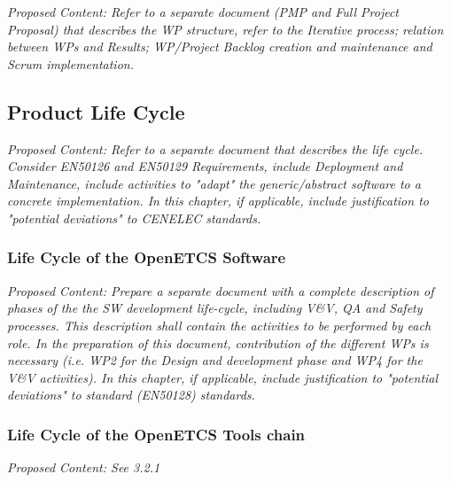 \documentclass{template/openetcs_article}
\begin{document}
\textit{Proposed Content: Refer to a separate document (PMP and Full Project Proposal)  that describes the WP structure, refer to  the Iterative process; relation between WPs and Results; WP/Project Backlog creation and maintenance and Scrum implementation.}


\subsection{Product Life Cycle }

\textit{Proposed Content: Refer to a separate document that describes the life cycle. Consider EN50126 and EN50129 Requirements, include Deployment and Maintenance, include activities to "adapt" the generic/abstract software to a concrete implementation.
In this chapter, if applicable, include justification to "potential deviations" to CENELEC standards.}

\subsubsection{Life Cycle of the OpenETCS Software}
\textit{Proposed Content: Prepare a separate document with a complete description of phases of the the SW development life-cycle, including V\&V, QA and Safety processes. This description shall contain the activities to be performed by each role.
In the preparation of this document, contribution of the different WPs is necessary (i.e. WP2 for the Design and development phase and WP4 for the V\&V activities).
In this chapter, if applicable, include justification to "potential deviations" to standard (EN50128) standards.}


\subsubsection{Life Cycle of the OpenETCS Tools chain}
\textit{Proposed Content: See 3.2.1}

\end{document}
